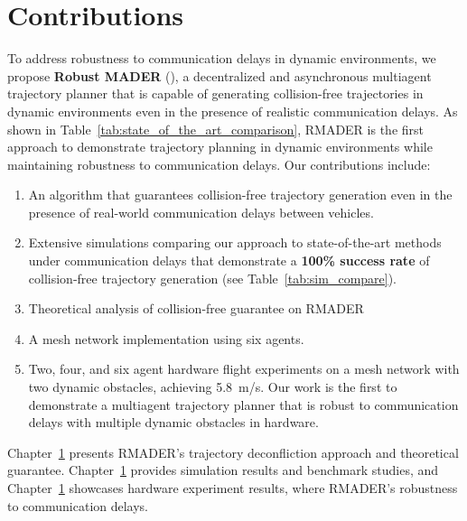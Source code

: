 \section{Contributions}

To address robustness to communication delays in dynamic environments, we propose \textbf{Robust MADER} (\RMADER{}), a decentralized and asynchronous multiagent trajectory planner that is capable of generating collision-free trajectories in dynamic environments even in the presence of realistic communication delays.
As shown in Table~\ref{tab:state_of_the_art_comparison}, RMADER is the first approach to demonstrate trajectory planning in dynamic environments while maintaining robustness to communication delays. Our contributions include:
\begin{enumerate}
  \item An algorithm that guarantees collision-free trajectory generation even in the presence of real-world communication delays between vehicles. 
  \item Extensive simulations comparing our approach to state-of-the-art methods under communication delays that demonstrate a \textbf{100\% success rate} of collision-free trajectory generation (see Table~\ref{tab:sim_compare}).
  \item Theoretical analysis of collision-free guarantee on RMADER
  \item A mesh network implementation using six agents. 
  \item Two, four, and six agent hardware flight experiments on a mesh network with two dynamic obstacles, achieving \SI{5.8}{\m/\s}. Our work is the first to demonstrate a multiagent trajectory planner that is robust to communication delays with multiple dynamic obstacles in hardware.
\end{enumerate}

Chapter~\ref{} presents RMADER's trajectory deconfliction approach and theoretical guarantee. Chapter~\ref{} provides simulation results and benchmark studies, and Chapter~\ref{} showcases hardware experiment results, where RMADER's robustness to communication delays.
